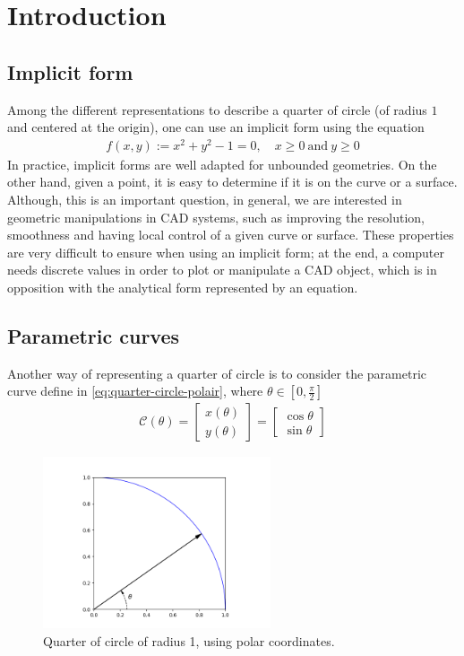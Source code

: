 
\chapter{Introduction}
\label{ch:cad-intro}
\section{Implicit form}

Among the different representations to describe a quarter of circle (of radius $1$ and centered at the origin), one can use an implicit form using the equation
\begin{align*}
  f(x,y) := x^2 + y^2 - 1 = 0, \quad x \ge 0 ~ \mbox{and} ~ y \ge 0 
\end{align*}
\noindent
In practice, implicit forms are well adapted for unbounded geometries. On the other hand, given a point, it is easy to determine if it is on the curve or a surface. Although, this is an important question, in general, we are interested in geometric manipulations in CAD systems, such as improving the resolution, smoothness and having local control of a given curve or surface. These properties are very difficult to ensure when using an implicit form; at the end, a computer needs discrete values in order to plot or manipulate a CAD object, which is in opposition with the analytical form represented by an equation. 


\section{Parametric curves}
Another way of representing a quarter of circle is to consider the parametric curve define in \ref{eq:quarter-circle-polair}, where $\theta \in \left[ 0, \frac{\pi}{2} \right]$
\begin{align}
  \mathcal{C}(\theta) = 
  \begin{bmatrix}
    x(\theta) \\ y(\theta)
  \end{bmatrix} =
  \begin{bmatrix}
    \cos \theta \\ \sin \theta
  \end{bmatrix}
  \label{eq:quarter-circle-polair}
\end{align}
\begin{figure}
\centering
\includegraphics[width=0.6\textwidth]{figures/cad/quarter_circle_polar}
\caption{Quarter of circle of radius 1, using polar coordinates.}
\label{fig:quarter_circle_polar}
\end{figure}

